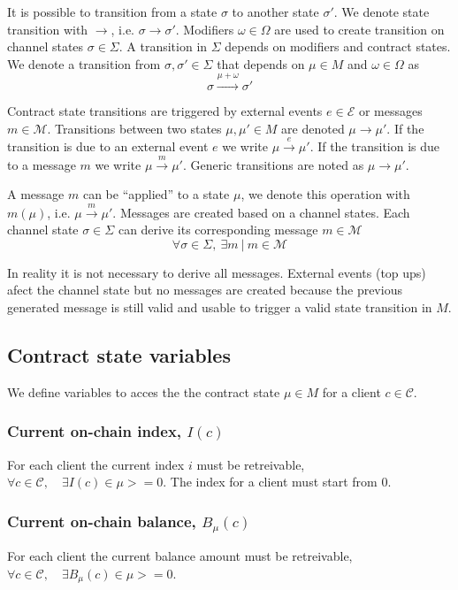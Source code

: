 \documentclass{llncs}
\begin{document}
It is possible to transition from a state $\sigma$ to another state $\sigma'$. We denote state transition with $\rightarrow$, i.e. $\sigma \rightarrow \sigma'$.  Modifiers $\omega \in \Omega$ are used to create transition on channel states $\sigma \in \Sigma$. A transition in $\Sigma$ depends on modifiers and contract states. We denote a transition from $\sigma, \sigma' \in \Sigma$ that depends on $\mu \in M$ and $\omega \in \Omega$ as
$$\sigma \xrightarrow{\mu+\omega} \sigma'$$

Contract state transitions are triggered by external events $e \in \mathcal{E}$ or messages $m \in \mathcal{M}$. Transitions between two states $\mu, \mu' \in M$ are denoted $\mu \rightarrow \mu '$. If the transition is due to an external event $e$ we write $\mu \xrightarrow{e} \mu '$. If the transition is due to a message $m$ we write $\mu \xrightarrow{m} \mu '$. Generic transitions are noted as $\mu \rightarrow \mu '$.

A message $m$ can be ``applied'' to a state $\mu$, we denote this operation with $m(\mu)$, i.e. $\mu \xrightarrow{m} \mu'$. Messages are created based on a channel states. Each channel state $\sigma \in \Sigma$ can derive its corresponding message $m \in \mathcal{M}$
$$\forall \sigma \in \Sigma,\ \exists m\ |\ m \in \mathcal{M}$$

In reality it is not necessary to derive all messages. External events (top ups) afect the channel state but no messages are created because the previous generated message is still valid and usable to trigger a valid state transition in $M$.

\subsection{Contract state variables} We define variables to acces the the contract state $\mu \in M$ for a client $c \in \mathcal{C}$.

\subsubsection{Current on-chain index, $I(c)$} For each client the current index $i$ must be retreivable, $\forall c \in \mathcal{C}, \quad \exists I(c) \in \mu >= 0$. The index for a client must start from $0$.

\subsubsection{Current on-chain balance, $B_\mu(c)$} For each client the current balance amount must be retreivable, $\forall c \in \mathcal{C}, \quad \exists B_\mu(c) \in \mu >= 0$.
\end{document}
